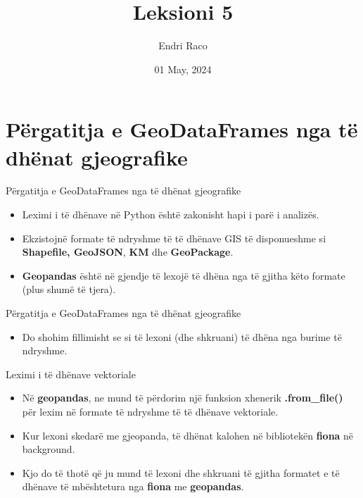 \documentclass[
  ignorenonframetext,
]{beamer}
\title{Leksioni 5}
\author{Endri Raco}
\date{01 May, 2024}
\providecommand{\tightlist}{%
  \setlength{\itemsep}{0pt}\setlength{\parskip}{0pt}}
\begin{document}
\frame{\titlepage}

\begin{frame}[allowframebreaks]
  \tableofcontents[hideallsubsections]
\end{frame}
\hypertarget{puxebrgatitja-e-geodataframes-nga-tuxeb-dhuxebnat-gjeografike}{%
\section{Përgatitja e GeoDataFrames nga të dhënat
gjeografike}\label{puxebrgatitja-e-geodataframes-nga-tuxeb-dhuxebnat-gjeografike}}

\begin{frame}{Përgatitja e GeoDataFrames nga të dhënat gjeografike}
\protect\hypertarget{puxebrgatitja-e-geodataframes-nga-tuxeb-dhuxebnat-gjeografike-1}{}
\begin{itemize}
\item
  Leximi i të dhënave në Python është zakonisht hapi i parë i analizës.
\item
  Ekzistojnë formate të ndryshme të të dhënave GIS të disponueshme si
  \textbf{Shapefile, GeoJSON}, \textbf{KM} dhe \textbf{GeoPackage}.
\item
  \textbf{Geopandas} është në gjendje të lexojë të dhëna nga të gjitha
  këto formate (plus shumë të tjera).
\end{itemize}
\end{frame}

\begin{frame}{Përgatitja e GeoDataFrames nga të dhënat gjeografike}
\protect\hypertarget{puxebrgatitja-e-geodataframes-nga-tuxeb-dhuxebnat-gjeografike-2}{}
\begin{itemize}
\tightlist
\item
  Do shohim fillimisht se si të lexoni (dhe shkruani) të dhëna nga
  burime të ndryshme.
\end{itemize}
\end{frame}

\begin{frame}{Leximi i të dhënave vektoriale}
\protect\hypertarget{leximi-i-tuxeb-dhuxebnave-vektoriale}{}
\begin{itemize}
\item
  Në \textbf{geopandas}, ne mund të përdorim një funksion xhenerik
  \textbf{.from\_file()} për lexim në formate të ndryshme të të dhënave
  vektoriale.
\item
  Kur lexoni skedarë me gjeopanda, të dhënat kalohen në bibliotekën
  \textbf{fiona} në background.
\item
  Kjo do të thotë që ju mund të lexoni dhe shkruani të gjitha formatet e
  të dhënave të mbështetura nga \textbf{fiona} me \textbf{geopandas}.
\end{itemize}
\end{frame}
\end{document}
